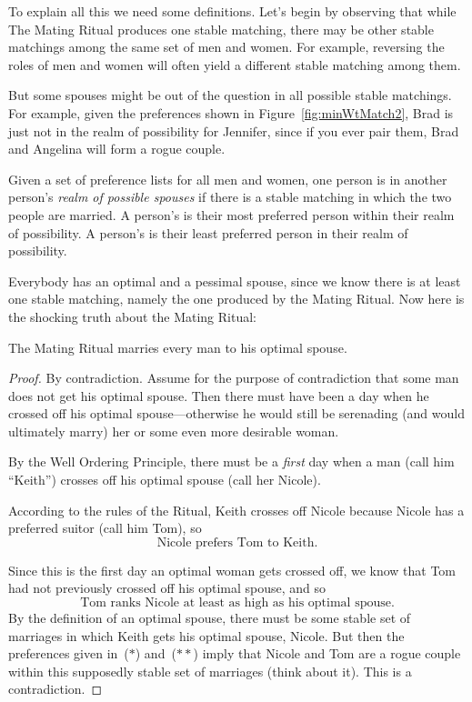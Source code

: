 To explain all this we need some definitions.  Let's begin by
observing that while The Mating Ritual produces one stable matching,
there may be other stable matchings among the same set of men and
women.  For example, reversing the roles of men and women will often
yield a different stable matching among them.

But some spouses might be out of the question in all possible stable
matchings.  For example, given the preferences shown in
Figure~\ref{fig:minWtMatch2}, Brad is just not in the realm of
possibility for Jennifer, since if you ever pair them, Brad and
Angelina will form a rogue couple.

\begin{definition}
Given a set of preference lists for all men and women, one person is
in another person's \emph{realm of possible spouses} if there is a
stable matching in which the two people are married.  A person's
 is their most preferred person within their
realm of possibility.  A person's  is their
least preferred person in their realm of possibility.
\end{definition}

Everybody has an optimal and a pessimal spouse, since we know there is at
least one stable matching, namely the one produced by the Mating Ritual.
Now here is the shocking truth about the Mating Ritual:

\begin{theorem}\label{boyopt}
The Mating Ritual marries every man to his optimal spouse.
\end{theorem}

\begin{proof}
By contradiction.  Assume for the purpose of contradiction that some
man does not get his optimal spouse.  Then there must have been a day
when he crossed off his optimal spouse---otherwise he would still be
serenading (and would ultimately marry) her or some even more
desirable woman.

By the Well Ordering Principle, there must be a \emph{first} day when
a man (call him ``Keith'') crosses off his optimal spouse (call her
Nicole).

According to the rules of the Ritual, Keith crosses off Nicole because
Nicole has a preferred suitor (call him Tom), so
\begin{equation}
\text{Nicole prefers Tom to Keith.} \tag{$*$}
\end{equation}

Since this is the first day an optimal woman gets crossed off, we know
that Tom had not previously crossed off his optimal spouse, and so
\begin{equation}\tag{$**$}
\text{Tom ranks Nicole at least as high as his optimal spouse.}
\end{equation}
By the definition of an optimal spouse, there must be some stable set
of marriages in which Keith gets his optimal spouse, Nicole.  But then
the preferences given in~($*$) and~($**$) imply that Nicole and Tom
are a rogue couple within this supposedly stable set of marriages
(think about it).  This is a contradiction.
\end{proof}


